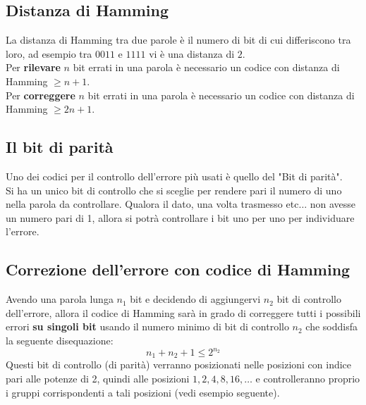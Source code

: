 \documentclass[12pt]{article}
\begin{document}
\subsection{Distanza di Hamming}
La distanza di Hamming tra due parole è il numero di bit di cui differiscono tra loro, ad esempio tra $0011$ e $1111$ vi è una distanza di $2$.\\
Per \textbf{rilevare} $n$ bit errati in una parola è necessario un codice con distanza di Hamming $\geq n + 1$.\\
Per \textbf{correggere} $n$ bit errati in una parola è necessario un codice con distanza di Hamming $\geq 2n+1$.
\subsection{Il bit di parità}
Uno dei codici per il controllo dell'errore più usati è quello del "Bit di parità".\\
Si ha un unico bit di controllo che si sceglie per rendere pari il numero di uno nella parola da controllare. Qualora il dato, una volta trasmesso etc$\dots$ non avesse un numero pari di 1, allora si potrà controllare i bit uno per uno per individuare l'errore.
\subsection{Correzione dell'errore con codice di Hamming}
Avendo una parola lunga $n_1$ bit e decidendo di aggiungervi $n_2$ bit di controllo dell'errore, allora il codice di Hamming sarà in grado di correggere tutti i possibili errori \textbf{su singoli bit} usando il numero minimo di bit di controllo $n_2$ che soddisfa la seguente disequazione:
\begin{equation}
    n_1 + n_2 + 1 \leq 2^{n_2} \label{eq:codice_Hamming}
\end{equation}
Questi bit di controllo (di parità) verranno posizionati nelle posizioni con indice pari alle potenze di 2, quindi alle posizioni $1, 2, 4, 8, 16, \dots$ e controlleranno proprio i gruppi corrispondenti a tali posizioni (vedi esempio seguente).
\end{document}
